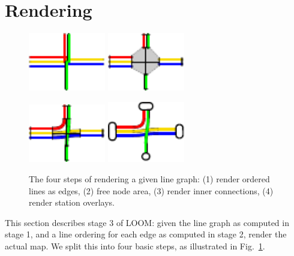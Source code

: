 \documentclass[format=acmsmall, review=false, screen=true]{acmart}
\begin{document}
\section{Rendering}\label{SEC:rendering}
%
\begin{figure}[b]
  \centering
  \includegraphics[width=0.3\textwidth]{render_examples/rendering/render_example1.pdf}
  \hspace{1.5cm}
  \includegraphics[width=0.3\textwidth]{render_examples/rendering/render_example2.pdf}

  \vspace{0.8cm}
  \centering
  \includegraphics[width=0.3\textwidth]{render_examples/rendering/render_example3.pdf}
  \hspace{1.5cm}
  \includegraphics[width=0.3\textwidth]{render_examples/rendering/render_example4.pdf}

	\caption{The four steps of rendering a given line graph: (1) render ordered lines as edges, (2) free node area, (3) render inner connections, (4) render station overlays.}
	\label{FIG:renderingproc}
\end{figure}
This section describes stage 3 of LOOM: given the line graph as computed in stage 1, and a line ordering for each edge as computed in stage 2, render the actual map.
We split this into four basic steps, as illustrated in Fig.~\ref{FIG:renderingproc}.
\end{document}
